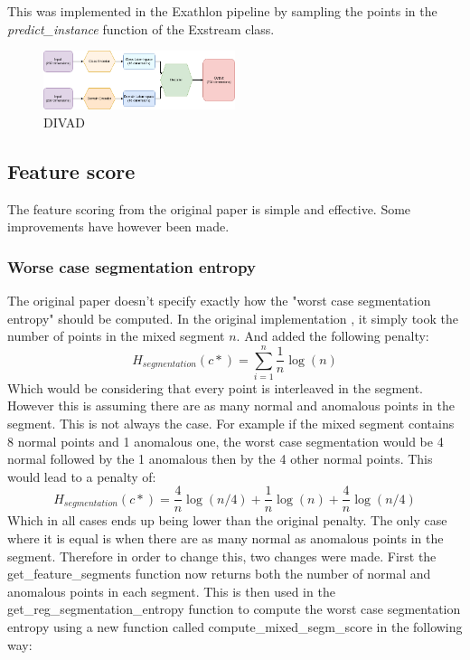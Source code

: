 \documentclass[11pt]{article}
\begin{document}
This was implemented in the Exathlon pipeline \cite{exathlon-private} by sampling the points in the \textit{predict\_instance} function of the Exstream class. 
\begin{figure}[h!]
    \centering
    \includegraphics[width=0.5\textwidth]{images/divad_simple.png}  %
    \caption{DIVAD}
    \label{fig:divad}
\end{figure}


\subsection{Feature score}
The feature scoring from the original paper is simple and effective. Some improvements have however been made.

\subsubsection{Worse case segmentation entropy}
\label{sec:worst_case_segmentation_entropy}
The original paper doesn't specify exactly how the "worst case segmentation entropy" should be computed. In the original implementation \cite{exathlon-private}, it simply took the number of points in the mixed segment $n$. And added the following penalty:
\begin{equation}
    H_{segmentation}(c*) = \sum_{i=1}^{n} \frac{1}{n} \log(n)
\end{equation}
Which would be considering that every point is interleaved in the segment. However this is assuming there are as many normal and anomalous points in the segment. This is not always the case. For example if the mixed segment contains 8 normal points and 1 anomalous one, the worst case segmentation would be 4 normal followed by the 1 anomalous then by the 4 other normal points. This would lead to a penalty of:
\begin{equation}
    H_{segmentation}(c*) = \frac{4}{n} \log(n/4) + \frac{1}{n} \log(n) + \frac{4}{n} \log(n/4)
\end{equation}
Which in all cases ends up being lower than the original penalty. The only case where it is equal is when there are as many normal as anomalous points in the segment.  
Therefore in order to change this, two changes were made. First the get\_feature\_segments function now returns both the number of normal and anomalous points in each segment. This is then used in the get\_reg\_segmentation\_entropy function to compute the worst case segmentation entropy using a new function called compute\_mixed\_segm\_score in the following way:
\end{document}

